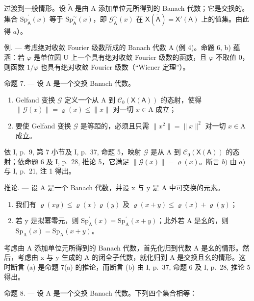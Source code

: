 过渡到一般情形。设 \(\widetilde{\mathsf{A}}\) 是由 A 添加单位元所得到的 Banach 代数；它是交换的。集合 \(\mathrm{Sp}_{\widetilde{\mathsf{A}}}^{\prime}(x)\) 等于 \(\mathrm{Sp}_{\widetilde{\mathsf{A}}}^{\sim}(x)\)，即 \(\mathcal{G}_{\widetilde{\mathsf{A}}}^{\sim}(x)\) 在 \(\mathsf{X}(\widetilde{\mathsf{A}}) = \mathsf{X}'(\mathsf{A})\) 上的值集。由此得 \(a\)）。

例. --- 考虑绝对收敛 Fourier 级数所成的 Banach 代数 A (例 4)。命题 6, b) 蕴涵：若 \(\varphi\) 是单位圆 U 上一个具有绝对收敛 Fourier 级数的函数，且 \(\varphi\) 不取值 0，则函数 \(1/\varphi\) 也具有绝对收敛 Fourier 级数（“Wiener 定理”）。

命题 7. --- 设 A 是一个交换 Banach 代数。

\begin{enumerate}
\def\labelenumi{\alph{enumi})}
\item
  Gelfand 变换 \(\mathcal{G}\) 定义一个从 A 到 \(\mathcal{C}_0(\mathsf{X}(\mathsf{A}))\) 的态射，使得 \(\| \mathcal{G}(x)\| = \varrho (x)\leqslant \| x\|\) 对一切 \(x\in \mathrm{A}\) 成立；
\item
  要使 Gelfand 变换 \(\mathcal{G}\) 是等距的，必须且只需 \(\|x^{2}\|=\|x\|^{2}\) 对一切 \(x\in\mathrm{A}\) 成立。
\end{enumerate}

依 I, p.~9, 第 7 小节及 I, p.~37, 命题 5，映射 \(\mathcal{G}\) 是从 A 到 \(\mathcal{C}_0(\mathsf{X}(\mathsf{A}))\) 的态射；依命题 6 及 I, p.~28, 推论 5，它满足 \(\| \mathcal{G}(x)\| = \varrho (x)\)。断言 \(b)\) 由 \(a)\) 与 I, p.~21, 注 1 得出。

推论. --- 设 A 是一个 Banach 代数，并设 x 与 y 是 A 中可交换的元素。

\begin{enumerate}
\def\labelenumi{\alph{enumi})}
\item
  我们有 \(\varrho(xy) \leqslant \varrho(x)\varrho(y)\) 及 \(\varrho(x + y) \leqslant \varrho(x) + \varrho(y)\)；
\item
  若 y 是拟幂零元，则 \(\mathrm{Sp}_{\mathrm{A}}^{\prime}(x)=\mathrm{Sp}_{\mathrm{A}}^{\prime}(x+y)\)；此外若 A 是幺的，则 \(\mathrm{Sp}_{\mathrm{A}}(x)=\mathrm{Sp}_{\mathrm{A}}(x+y)\)。
\end{enumerate}

考虑由 A 添加单位元所得到的 Banach 代数，首先化归到代数 A 是幺的情形。然后，考虑由 x 与 y 生成的 A 的闭全子代数，就化归到 A 是交换且幺的情形。这时断言 (a) 是命题 7(a) 的推论，而断言 (b) 由 I, p.~37, 命题 6 及 I, p.~28, 推论 5 得出。

命题 8. --- 设 A 是一个交换 Banach 代数。下列四个集合相等：

